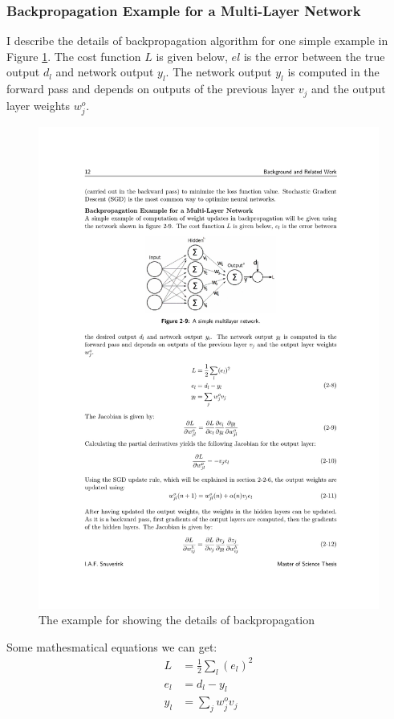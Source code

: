     \subsubsection{Backpropagation Example for a Multi-Layer Network}
    I describe the details of backpropagation algorithm for one simple example in Figure \ref{bp}. The cost function $L$ is given below, $el$ is the error between the true output $d_l$ and network output $y_l$. The network output $y_l$ is computed in the forward pass and depends on outputs of the previous layer $v_j$ and the output layer weights $w^{o}_j$.
    \begin{figure}[!h]
        \centering
        \includegraphics{Figures/bp.pdf}
        \caption{The example for showing the details of backpropagation}
        \label{bp}
    \end{figure}
    Some mathesmatical equations we can get:
    \begin{equation}
        \begin{aligned}
            L &= \frac{1}{2} \sum_{l}(e_l)^2 \\
            e_l &= d_l -y_l \\
            y_l &= \sum_{j}w^{o}_j v_j 
        \end{aligned}
        \label{me}
    \end{equation}

